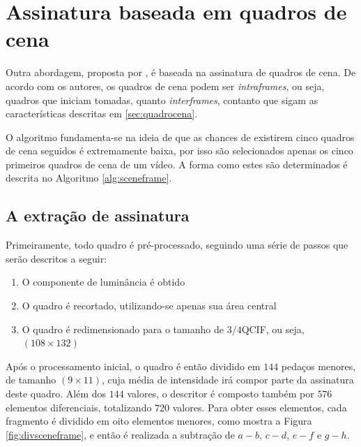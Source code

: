 \section{Assinatura baseada em quadros de cena}

	Outra abordagem, proposta por \citeauthor{mao2015sceneframe}, é baseada na assinatura de quadros de cena. De acordo com os autores, os quadros de cena podem ser \textit{intraframes}, ou seja, quadros que iniciam tomadas, quanto \textit{interframes}, contanto que sigam as características descritas em \ref{sec:quadrocena}.
    
    O algoritmo fundamenta-se na ideia de que as chances de existirem cinco quadros de cena seguidos é extremamente baixa, por isso são selecionados apenas os cinco primeiros quadros de cena de um vídeo. A forma como estes são determinados é descrita no Algoritmo \ref{alg:sceneframe}.

\subsection{A extração de assinatura}



Primeiramente, todo quadro é pré-processado, seguindo uma série de passos que serão descritos a seguir:

\begin{enumerate}
	\item O componente de luminância é obtido
   	\item O quadro é recortado, utilizando-se apenas sua área central
    \item O quadro é redimensionado para o tamanho de $3/4$QCIF, ou seja, $(108\times132)$
\end{enumerate}

Após o processamento inicial, o quadro é então dividido em $144$ pedaços menores, de tamanho $(9\times11)$, cuja média de intensidade irá compor parte da assinatura deste quadro. Além dos $144$ valores, o descritor é composto também por $576$ elementos diferenciais, totalizando $720$ valores. Para obter esses elementos, cada fragmento é dividido em oito elementos menores, como mostra a Figura \ref{fig:divsceneframe}, e então é realizada a subtração de $a - b$, $c - d$, $e - f$ e $g - h$.


